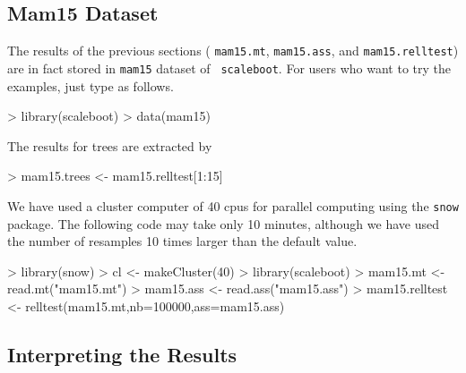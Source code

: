 \documentclass[a4paper]{amsart}
\begin{document}
\subsection{Mam15 Dataset}

The results of the previous sections (
{\tt mam15.mt}, {\tt mam15.ass}, and
{\tt mam15.relltest}) are in fact stored in {\tt mam15} dataset of {\tt
scaleboot}. For users who want to try the examples, just type as follows.
\begin{Schunk}
\begin{Sinput}
> library(scaleboot)
> data(mam15)
\end{Sinput}
\end{Schunk}

The results for trees are extracted by
\begin{Schunk}
\begin{Sinput}
> mam15.trees <- mam15.relltest[1:15]
\end{Sinput}
\end{Schunk}

We have used a cluster computer of 40 cpus for parallel computing
using the {\tt snow} package.  The following code may take only 10
minutes, although we have used the number of resamples 10 times
larger than the default value.
\begin{Schunk}
\begin{Sinput}
> library(snow)
> cl <- makeCluster(40)
> library(scaleboot)
> mam15.mt <- read.mt("mam15.mt")
> mam15.ass <- read.ass("mam15.ass")
> mam15.relltest <- relltest(mam15.mt,nb=100000,ass=mam15.ass)
\end{Sinput}
\end{Schunk}

\subsection{Interpreting the Results}
\end{document}
